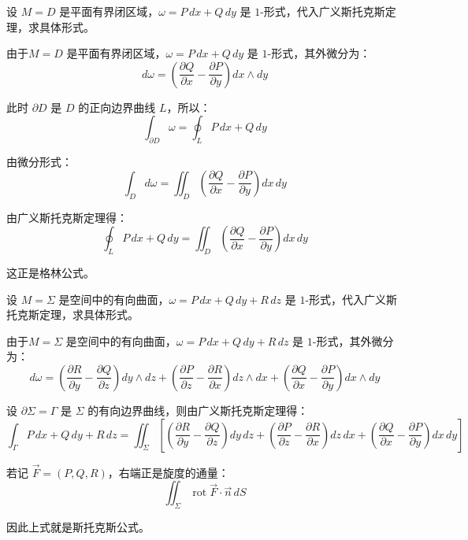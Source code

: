 \begin{myexample}
  设 \(M=D\) 是平面有界闭区域，\(\omega=P\,dx+Q\,dy\) 是 \(1\)-形式，代入广义斯托克斯定理，求具体形式。
  
  由于\(M=D\) 是平面有界闭区域，\(\omega=P\,dx+Q\,dy\) 是 \(1\)-形式，其外微分为：
\[
d\omega
=
\left(\frac{\partial Q}{\partial x}-\frac{\partial P}{\partial y}\right)dx\wedge dy
\]

此时 \(\partial D\) 是 \(D\) 的正向边界曲线 \(L\)，所以：
\[
\int_{\partial D}\omega=\oint_L P\,dx+Q\,dy
\]

由微分形式：
\[
\int_D d\omega
=
\iint_D
\left(\frac{\partial Q}{\partial x}-\frac{\partial P}{\partial y}\right)dx\,dy
\]

由广义斯托克斯定理得：
\[
\oint_L P\,dx+Q\,dy
=
\iint_D
\left(\frac{\partial Q}{\partial x}-\frac{\partial P}{\partial y}\right)dx\,dy
\]

这正是格林公式。
\end{myexample}


\begin{myexample}
  设 \(M=\Sigma\) 是空间中的有向曲面，\(\omega=P\,dx+Q\,dy+R\,dz\) 是 \(1\)-形式，代入广义斯托克斯定理，求具体形式。
  
  由于\(M=\Sigma\) 是空间中的有向曲面，\(\omega=P\,dx+Q\,dy+R\,dz\) 是 \(1\)-形式，其外微分为：
\[
d\omega
=
\left(\frac{\partial R}{\partial y}-\frac{\partial Q}{\partial z}\right)dy\wedge dz
+
\left(\frac{\partial P}{\partial z}-\frac{\partial R}{\partial x}\right)dz\wedge dx
+
\left(\frac{\partial Q}{\partial x}-\frac{\partial P}{\partial y}\right)dx\wedge dy
\]

设 \(\partial\Sigma=\Gamma\) 是 \(\Sigma\) 的有向边界曲线，则由广义斯托克斯定理得：
\[
\int_\Gamma P\,dx+Q\,dy+R\,dz
=
\iint_\Sigma
\left[
\left(\frac{\partial R}{\partial y}-\frac{\partial Q}{\partial z}\right)dy\,dz
+
\left(\frac{\partial P}{\partial z}-\frac{\partial R}{\partial x}\right)dz\,dx
+
\left(\frac{\partial Q}{\partial x}-\frac{\partial P}{\partial y}\right)dx\,dy
\right]
\]

若记 \(\vec F=(P,Q,R)\)，右端正是旋度的通量：
\[
\iint_\Sigma
\operatorname{rot}\vec F\cdot \vec n\,dS
\]

因此上式就是斯托克斯公式。
\end{myexample}


